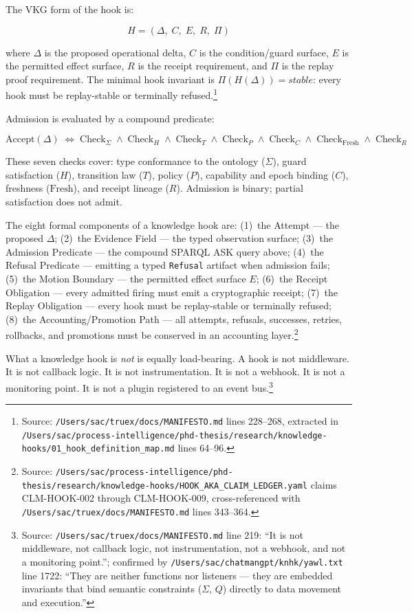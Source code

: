 The VKG form of the hook is:

\[
  H = (\Delta,\; C,\; E,\; R,\; \Pi)
\]

where $\Delta$ is the proposed operational delta, $C$ is the condition/guard surface,
$E$ is the permitted effect surface, $R$ is the receipt requirement, and $\Pi$ is the replay
proof requirement. The minimal hook invariant is $\Pi(H(\Delta)) = \textit{stable}$: every
hook must be replay-stable or terminally refused.\footnote{Source:
\texttt{/Users/sac/truex/docs/MANIFESTO.md} lines 228--268, extracted in
\texttt{/Users/sac/process-intelligence/phd-thesis/research/knowledge-hooks/01\_hook\_definition\_map.md}
lines 64--96.}

Admission is evaluated by a compound predicate:

\[
  \text{Accept}(\Delta) \;\Leftrightarrow\;
    \text{Check}_\Sigma \;\wedge\;
    \text{Check}_H \;\wedge\;
    \text{Check}_T \;\wedge\;
    \text{Check}_P \;\wedge\;
    \text{Check}_C \;\wedge\;
    \text{Check}_{\text{Fresh}} \;\wedge\;
    \text{Check}_R
\]

These seven checks cover: type conformance to the ontology ($\Sigma$), guard satisfaction
($H$), transition law ($T$), policy ($P$), capability and epoch binding ($C$),
freshness ($\text{Fresh}$), and receipt lineage ($R$). Admission is binary; partial satisfaction
does not admit.

The eight formal components of a knowledge hook are: (1)~the Attempt --- the proposed $\Delta$;
(2)~the Evidence Field --- the typed observation surface; (3)~the Admission Predicate --- the
compound SPARQL ASK query above; (4)~the Refusal Predicate --- emitting a typed
\texttt{Refusal} artifact when admission fails; (5)~the Motion Boundary --- the permitted
effect surface $E$; (6)~the Receipt Obligation --- every admitted firing must emit a
cryptographic receipt; (7)~the Replay Obligation --- every hook must be replay-stable or
terminally refused; (8)~the Accounting/Promotion Path --- all attempts, refusals, successes,
retries, rollbacks, and promotions must be conserved in an accounting layer.\footnote{Source:
\texttt{/Users/sac/process-intelligence/phd-thesis/research/knowledge-hooks/HOOK\_AKA\_CLAIM\_LEDGER.yaml}
claims CLM-HOOK-002 through CLM-HOOK-009, cross-referenced with
\texttt{/Users/sac/truex/docs/MANIFESTO.md} lines 343--364.}

What a knowledge hook is \emph{not} is equally load-bearing. A hook is not middleware. It is
not callback logic. It is not instrumentation. It is not a webhook. It is not a monitoring
point. It is not a plugin registered to an event bus.\footnote{Source:
\texttt{/Users/sac/truex/docs/MANIFESTO.md} line 219: ``It is not middleware, not callback logic,
not instrumentation, not a webhook, and not a monitoring point.''; confirmed by
\texttt{/Users/sac/chatmangpt/knhk/yawl.txt} line 1722: ``They are neither functions nor
listeners --- they are embedded invariants that bind semantic constraints ($\Sigma$, $Q$)
directly to data movement and execution.''}

